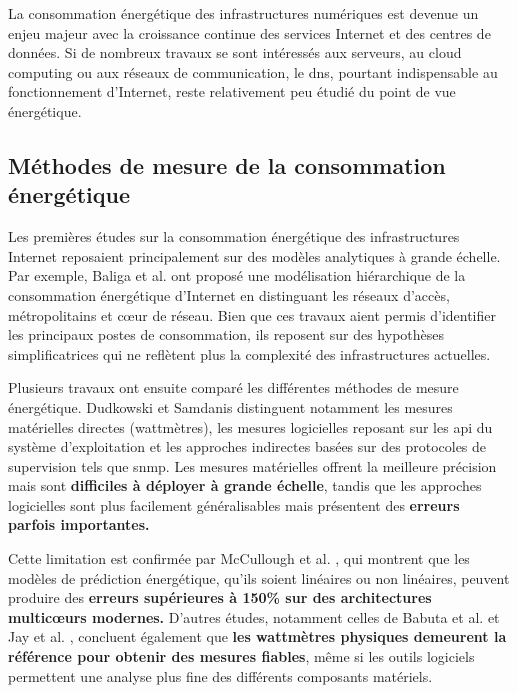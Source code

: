 \documentclass[12pt, a4paper]{report}
\begin{document}
	La consommation énergétique des infrastructures numériques est devenue un enjeu majeur avec la croissance continue des services Internet et des centres de données. Si de nombreux travaux se sont intéressés aux serveurs, au cloud computing ou aux réseaux de communication, le \gls{dns}, pourtant indispensable au fonctionnement d'Internet, reste relativement peu étudié du point de vue énergétique.

	\subsection{Méthodes de mesure de la consommation énergétique}

	Les premières études sur la consommation énergétique des infrastructures Internet reposaient principalement sur des modèles analytiques à grande échelle. Par exemple, Baliga et al. \cite{baliga2011energy_internet} ont proposé une modélisation hiérarchique de la consommation énergétique d'Internet en distinguant les réseaux d'accès, métropolitains et cœur de réseau. Bien que ces travaux aient permis d'identifier les principaux postes de consommation, ils reposent sur des hypothèses simplificatrices qui ne reflètent plus la complexité des infrastructures actuelles.

	Plusieurs travaux ont ensuite comparé les différentes méthodes de mesure énergétique. Dudkowski et Samdanis \cite{dudkowski2019energy_taxonomy} distinguent notamment les mesures matérielles directes (wattmètres), les mesures logicielles reposant sur les \gls{api} du système d'exploitation et les approches indirectes basées sur des protocoles de supervision tels que \gls{snmp}. Les mesures matérielles offrent la meilleure précision mais sont \textbf{difficiles à déployer à grande échelle}, tandis que les approches logicielles sont plus facilement généralisables mais présentent des \textbf{erreurs parfois importantes.}

	Cette limitation est confirmée par McCullough et al. \cite{mccullough2011energy_error}, qui montrent que les modèles de prédiction énergétique, qu'ils soient linéaires ou non linéaires, peuvent produire des \textbf{erreurs supérieures à 150\% sur des architectures multicœurs modernes.} D'autres études, notamment celles de Babuta et al. \cite{babuta2020power_tools} et Jay et al. \cite{jay2016power_tools}, concluent également que \textbf{les wattmètres physiques demeurent la référence pour obtenir des mesures fiables}, même si les outils logiciels permettent une analyse plus fine des différents composants matériels.
\end{document}
